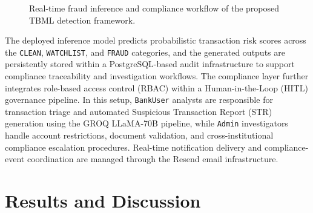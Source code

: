 \documentclass[conference]{IEEEtran}
\begin{document}
\begin{figure}[t]
{
}
\caption{Real-time fraud inference and compliance workflow of the proposed TBML detection framework.}
\label{fig:realtime_workflow_final}
\end{figure}

The deployed inference model predicts probabilistic transaction risk scores across the \texttt{CLEAN}, \texttt{WATCHLIST}, and \texttt{FRAUD} categories, and the generated outputs are persistently stored within a PostgreSQL-based audit infrastructure to support compliance traceability and investigation workflows. The compliance layer further integrates role-based access control (RBAC) within a Human-in-the-Loop (HITL) governance pipeline. In this setup, \texttt{BankUser} analysts are responsible for transaction triage and automated Suspicious Transaction Report (STR) generation using the GROQ LLaMA-70B pipeline, while \texttt{Admin} investigators handle account restrictions, document validation, and cross-institutional compliance escalation procedures. Real-time notification delivery and compliance-event coordination are managed through the Resend email infrastructure.


\section{\textbf{Results and Discussion}}
\end{document}
